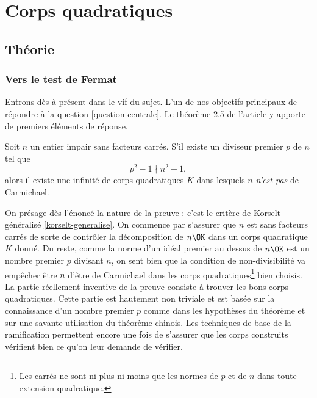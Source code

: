 \section{Corps quadratiques}

\subsection{Théorie}

\subsubsection{Vers le test de Fermat}

Entrons dès à présent dans le vif du sujet. L'un de nos objectifs principaux de répondre à la question \ref{question-centrale}. Le théorème 2.5 de l'article y apporte de premiers éléments de réponse.

\begin{theoreme}\label{theoreme-2.5}
	Soit $n$ un entier impair sans facteurs carrés. S'il existe un diviseur premier $p$ de $n$ tel que $$p^2 - 1 \nmid n^2 - 1,$$ alors il existe une infinité de corps quadratiques $K$ dans lesquels $n$ \emph{n'est pas} de Carmichael.
\end{theoreme}

\begin{MotSurPreuve}
	On présage dès l'énoncé la nature de la preuve : c'est le critère de Korselt généralisé \ref{korselt-generalise}. On commence par s'assurer que $n$ est sans facteurs carrés de sorte de contrôler la décomposition de $n\OK$ dans un corps quadratique $K$ donné. Du reste, comme la norme d'un idéal premier au dessus de $n\OK$ est un nombre premier $p$ divisant $n$, on sent bien que la condition de non-divisibilité va empêcher être $n$ d'être de Carmichael dans les corps quadratiques\footnote{Les carrés ne sont ni plus ni moins que les normes de $p$ et de $n$ dans toute extension quadratique.} bien choisis. La partie réellement inventive de la preuve consiste à trouver les bons corps quadratiques. Cette partie est hautement non triviale et est basée sur la connaissance d'un nombre premier $p$ comme dans les hypothèses du théorème et sur une savante utilisation du théorème chinois. Les techniques de base de la ramification permettent encore une fois de s'assurer que les corps construits vérifient bien ce qu'on leur demande de vérifier. \\
\end{MotSurPreuve}

